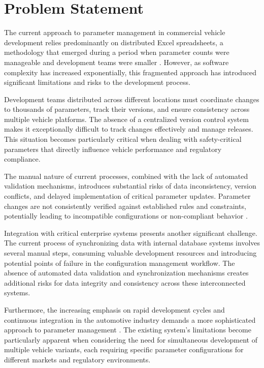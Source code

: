 \section{Problem Statement}
\label{sec:problem}

The current approach to parameter management in commercial vehicle development relies predominantly on distributed Excel spreadsheets, a methodology that emerged during a period when parameter counts were manageable and development teams were smaller \cite{trovao2024evolution}. However, as software complexity has increased exponentially, this fragmented approach has introduced significant limitations and risks to the development process.

Development teams distributed across different locations must coordinate changes to thousands of parameters, track their versions, and ensure consistency across multiple vehicle platforms. The absence of a centralized version control system makes it exceptionally difficult to track changes effectively and manage releases. This situation becomes particularly critical when dealing with safety-critical parameters that directly influence vehicle performance and regulatory compliance.

The manual nature of current processes, combined with the lack of automated validation mechanisms, introduces substantial risks of data inconsistency, version conflicts, and delayed implementation of critical parameter updates. Parameter changes are not consistently verified against established rules and constraints, potentially leading to incompatible configurations or non-compliant behavior \cite{staron2021automotive}.

Integration with critical enterprise systems presents another significant challenge. The current process of synchronizing data with internal database systems involves several manual steps, consuming valuable development resources and introducing potential points of failure in the configuration management workflow. The absence of automated data validation and synchronization mechanisms creates additional risks for data integrity and consistency across these interconnected systems.

Furthermore, the increasing emphasis on rapid development cycles and continuous integration in the automotive industry demands a more sophisticated approach to parameter management \cite{broy2006challenges}. The existing system's limitations become particularly apparent when considering the need for simultaneous development of multiple vehicle variants, each requiring specific parameter configurations for different markets and regulatory environments.

